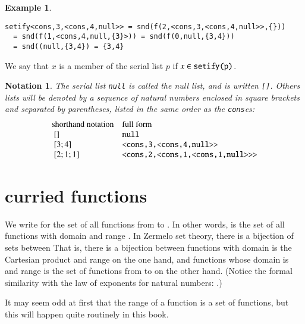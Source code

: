 \documentclass[cup9a]{cupbook}
\newtheorem{example}{Example}[chapter]
\newtheorem{notation}{Notation}[chapter]
\begin{document}
\begin{example}
\begin{verbatim}
setify<cons,3,<cons,4,null>> = snd(f(2,<cons,3,<cons,4,null>>,{})) 
  = snd(f(1,<cons,4,null,{3}>)) = snd(f(0,null,{3,4})) 
  = snd((null,{3,4}) = {3,4}
\end{verbatim}
\end{example}

We say that $x$ is a member of the serial list $p$ if $x\in\verb!setify(p)!$.


\begin{notation} The serial list \verb!null! is called the null list, and is written \verb![]!.  Others lists will be denoted by a sequence of natural numbers enclosed in square brackets and separated by parentheses, listed in the same order as the \verb!cons!es:
$$
\begin{array}{lll}
\hbox{shorthand notation} & \hbox{full form}\\
~[]&\verb!null!\\
~[3;4]&\verb!<cons,3,<cons,4,null>>!\\
~[2;1;1]&\verb!<cons,2,<cons,1,<cons,1,null>>>!\\
\end{array}
$$
\end{notation}








\section{curried functions}

We write  for the set of all functions from  to .  In other
words,  is the set of all functions with domain  and range .
In Zermelo set theory, there is a bijection of sets between
That is, there is a bijection between functions with domain is the Cartesian product  and range  on the one hand, and functions whose domain is  and range is the set of functions from  to  on the other hand.
(Notice the formal similarity with the law of exponents for natural numbers:
.)

It may seem odd at first that the range of a function is a set of functions, but this will happen quite routinely in this book.
\end{document}
